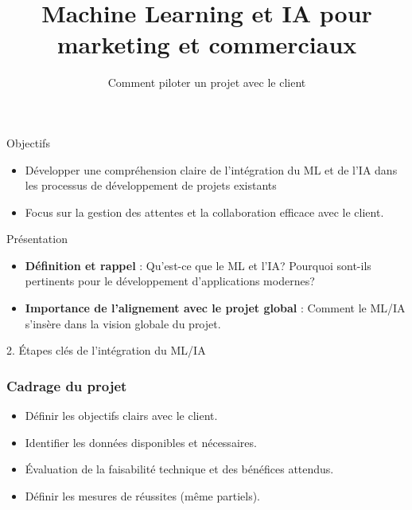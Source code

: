 
\title{Machine Learning et IA pour marketing et commerciaux}
\subtitle{Comment piloter un projet avec le client}



\begin{frame}
  \titlepage
\end{frame}

\begin{frame}{Objectifs}
  \begin{itemize}
  \item Développer une compréhension claire de l'intégration du ML et
    de l'IA dans les processus de développement de projets existants
  \item Focus sur la gestion des attentes et la collaboration efficace
    avec le client.
  \end{itemize}
\end{frame}

\begin{frame}{Présentation}
  \begin{itemize}
  \item \textbf{Définition et rappel} : Qu'est-ce que le ML et l'IA?
    Pourquoi sont-ils pertinents pour le développement d'applications
    modernes?
  \item \textbf{Importance de l'alignement avec le projet global} :
    Comment le ML/IA s'insère dans la vision globale du projet.
  \end{itemize}
\end{frame}

\begin{frame}{2. Étapes clés de l'intégration du ML/IA}

  \subsubsection{Cadrage du projet}
  \begin{itemize}
  \item Définir les objectifs clairs avec le client.
  \item Identifier les données disponibles et nécessaires.
  \item Évaluation de la faisabilité technique et des bénéfices attendus.
  \item Définir les mesures de réussites (même partiels).
  \end{itemize}
\end{frame}

